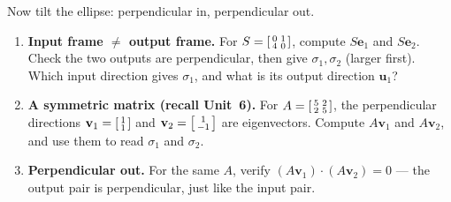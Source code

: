 \documentclass[10pt]{article}
\newcommand{\uu}{\mathbf{u}}
\newcommand{\vv}{\mathbf{v}}
\newcommand{\ee}{\mathbf{e}}
\begin{document}
\begin{tcolorbox}[colback=white, colframe=black!40, title=\textbf{Tier A --- Approaching Proficiency},
    fonttitle=\bfseries, arc=1.5mm, left=3mm, right=3mm, top=2mm, bottom=2mm, breakable]
Now tilt the ellipse: perpendicular in, perpendicular out.
\begin{enumerate}[leftmargin=1.7em, itemsep=9pt]
  \item \textbf{Input frame $\ne$ output frame.} For $S=\begin{bsmallmatrix} 0 & 1\\ 4 & 0 \end{bsmallmatrix}$,
        compute $S\ee_1$ and $S\ee_2$. Check the two outputs are perpendicular, then give
        $\sigma_1,\sigma_2$ (larger first). Which input direction gives $\sigma_1$, and what is its
        output direction $\uu_1$? 
  \item \textbf{A symmetric matrix (recall Unit~6).} For $A=\begin{bsmallmatrix} 5 & 2\\ 2 & 5 \end{bsmallmatrix}$,
        the perpendicular directions $\vv_1=\begin{bsmallmatrix} 1\\ 1 \end{bsmallmatrix}$ and
        $\vv_2=\begin{bsmallmatrix} 1\\ -1 \end{bsmallmatrix}$ are eigenvectors. Compute $A\vv_1$ and
        $A\vv_2$, and use them to read $\sigma_1$ and $\sigma_2$. 
  \item \textbf{Perpendicular out.} For the same $A$, verify $(A\vv_1)\cdot(A\vv_2)=0$ --- the output
        pair is perpendicular, just like the input pair. \writeline
\end{enumerate}
\end{tcolorbox}
\end{document}
